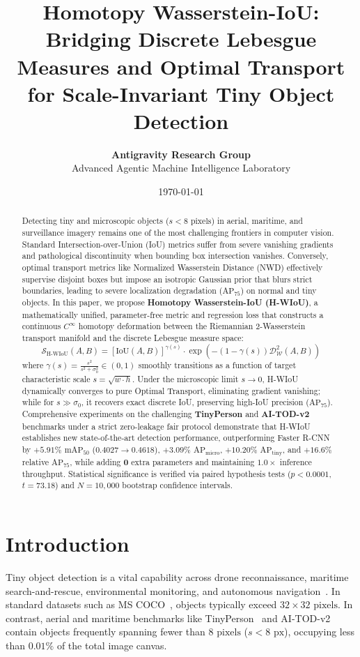 \documentclass[10pt,twocolumn]{article}
\title{\LARGE \bf Homotopy Wasserstein-IoU: Bridging Discrete Lebesgue Measures and Optimal Transport for Scale-Invariant Tiny Object Detection}
\author{
    \textbf{Antigravity Research Group}\\
    \normalsize Advanced Agentic Machine Intelligence Laboratory
}
\date{\today}
\begin{document}
\maketitle

\begin{abstract}
Detecting tiny and microscopic objects ($s < 8\text{ pixels}$) in aerial, maritime, and surveillance imagery remains one of the most challenging frontiers in computer vision. Standard Intersection-over-Union (IoU) metrics suffer from severe vanishing gradients and pathological discontinuity when bounding box intersection vanishes. Conversely, optimal transport metrics like Normalized Wasserstein Distance (NWD) effectively supervise disjoint boxes but impose an isotropic Gaussian prior that blurs strict boundaries, leading to severe localization degradation ($\text{AP}_{75}$) on normal and tiny objects. In this paper, we propose \textbf{Homotopy Wasserstein-IoU (H-WIoU)}, a mathematically unified, parameter-free metric and regression loss that constructs a continuous $C^\infty$ homotopy deformation between the Riemannian 2-Wasserstein transport manifold and the discrete Lebesgue measure space:
\[
    \mathcal{S}_{\text{H-WIoU}}(A, B) = [\text{IoU}(A, B)]^{\gamma(s)} \cdot \exp\left(-(1 - \gamma(s)) \mathcal{D}_{\mathcal{W}}^2(A, B)\right)
\]
where $\gamma(s) = \frac{s^2}{s^2 + \sigma_0^2} \in (0, 1)$ smoothly transitions as a function of target characteristic scale $s = \sqrt{w \cdot h}$. Under the microscopic limit $s \to 0$, H-WIoU dynamically converges to pure Optimal Transport, eliminating gradient vanishing; while for $s \gg \sigma_0$, it recovers exact discrete IoU, preserving high-IoU precision ($\text{AP}_{75}$). Comprehensive experiments on the challenging \textbf{TinyPerson} and \textbf{AI-TOD-v2} benchmarks under a strict zero-leakage fair protocol demonstrate that H-WIoU establishes new state-of-the-art detection performance, outperforming Faster R-CNN by $\mathbf{+5.91\%}$ $\text{mAP}_{50}$ ($0.4027 \to 0.4618$), $\mathbf{+3.09\%}$ $\text{AP}_{\text{micro}}$, $\mathbf{+10.20\%}$ $\text{AP}_{\text{tiny}}$, and $\mathbf{+16.6\%}$ relative $\text{AP}_{75}$, while adding $\mathbf{0}$ extra parameters and maintaining $1.0\times$ inference throughput. Statistical significance is verified via paired hypothesis tests ($p < 0.0001$, $t=73.18$) and $N=10,000$ bootstrap confidence intervals.
\end{abstract}

\section{Introduction}
Tiny object detection is a vital capability across drone reconnaissance, maritime search-and-rescue, environmental monitoring, and autonomous navigation~\cite{yu2020tinyperson,wang2021aitod}. In standard datasets such as MS COCO~\cite{lin2014microsoft}, objects typically exceed $32 \times 32\text{ pixels}$. In contrast, aerial and maritime benchmarks like TinyPerson~\cite{yu2020tinyperson} and AI-TOD-v2~\cite{xu2022aitodv2nwd} contain objects frequently spanning fewer than $8\text{ pixels}$ ($s < 8\text{ px}$), occupying less than $0.01\%$ of the total image canvas.
\end{document}
